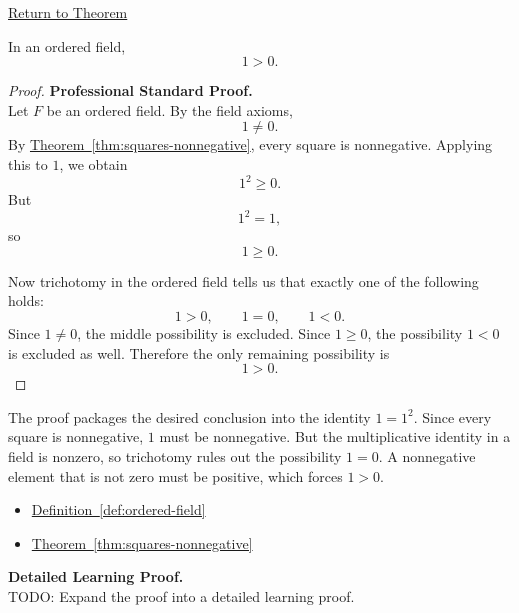 \newpage
{}
\label{prf:one-positive}

\begin{remark*}[Return]
\hyperref[thm:one-positive]{Return to Theorem}
\end{remark*}

\begin{theorem*}[$1$ Is Positive]
In an ordered field,
\[
1>0.
\]
\end{theorem*}

\begin{proof}
\textbf{Professional Standard Proof.}~\\
Let $F$ be an ordered field.  By the field axioms,
\[
1\neq 0.
\]
By \hyperref[thm:squares-nonnegative]{Theorem~\ref*{thm:squares-nonnegative}},
every square is nonnegative.  Applying this to $1$, we obtain
\[
1^2\ge 0.
\]
But
\[
1^2=1,
\]
so
\[
1\ge 0.
\]

Now trichotomy in the ordered field tells us that exactly one of the
following holds:
\[
1>0,\qquad 1=0,\qquad 1<0.
\]
Since $1\neq 0$, the middle possibility is excluded.  Since $1\ge 0$, the
possibility $1<0$ is excluded as well.  Therefore the only remaining
possibility is
\[
1>0.
\]
\end{proof}

\begin{remark*}
The proof packages the desired conclusion into the identity $1=1^2$.  Since
every square is nonnegative, $1$ must be nonnegative.  But the multiplicative
identity in a field is nonzero, so trichotomy rules out the possibility
$1=0$.  A nonnegative element that is not zero must be positive, which
forces $1>0$.
\end{remark*}

\begin{dependencies}
\begin{itemize}
  \item \hyperref[def:ordered-field]{Definition~\ref*{def:ordered-field}}
  \item \hyperref[thm:squares-nonnegative]{Theorem~\ref*{thm:squares-nonnegative}}
\end{itemize}
\end{dependencies}

\textbf{Detailed Learning Proof.}~\\
TODO: Expand the proof into a detailed learning proof.

